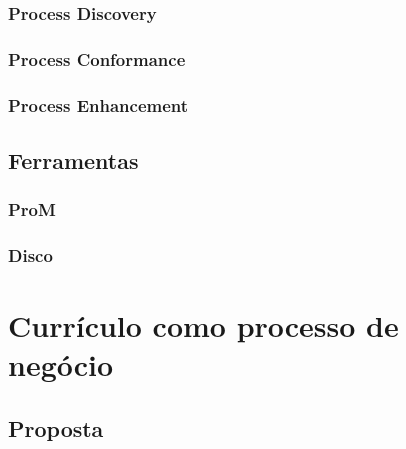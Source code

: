 \documentclass[a4paper]{article}
\begin{document}
\lipsum[10]
\lipsum[10]
\lipsum[10]
\lipsum[10]
\lipsum[10]
\lipsum[10]

\subsubsection{Process Discovery}

\lipsum[10]
\lipsum[10]
\lipsum[10]
\lipsum[10]
\lipsum[10]
\lipsum[10]

\subsubsection{Process Conformance}

\lipsum[10]
\lipsum[10]
\lipsum[10]
\lipsum[10]
\lipsum[10]
\lipsum[10]

\subsubsection{Process Enhancement}

\lipsum[10]
\lipsum[10]
\lipsum[10]
\lipsum[10]
\lipsum[10]
\lipsum[10]

\subsection{Ferramentas}

\lipsum[10]
\lipsum[10]
\lipsum[10]
\lipsum[10]
\lipsum[10]

\subsubsection{ProM}

\cite{ProM}
\lipsum[10]
\lipsum[10]
\lipsum[10]
\lipsum[10]
\lipsum[10]

\subsubsection{Disco}

\cite{Disco}
\lipsum[10]
\lipsum[10]
\lipsum[10]
\lipsum[10]
\lipsum[10]

\section{Currículo como processo de negócio}

\lipsum[10]
\lipsum[10]
\lipsum[10]

\subsection{Proposta}
\end{document}
